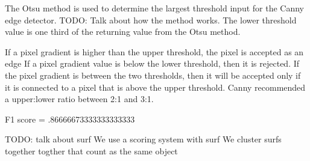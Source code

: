 \documentclass[a4paper]{article}
\begin{document}
The Otsu method is used to determine the largest threshold input for the Canny
edge detector.  TODO: Talk about how the method works.  The lower threshold
value is one third of the returning value from the Otsu method.

If a pixel gradient is higher than the upper threshold, the pixel is accepted
as an edge If a pixel gradient value is below the lower threshold, then it is
rejected.  If the pixel gradient is between the two thresholds, then it will be
accepted only if it is connected to a pixel that is above the upper threshold.
Canny recommended a upper:lower ratio between 2:1 and 3:1.

F1 score = .86666673333333333333

TODO: talk about surf
We use a scoring system with surf
We cluster surfs together togther that count as the same object

\vspace{-4em}
\end{document}

